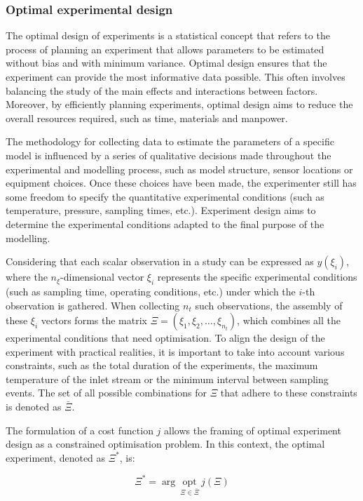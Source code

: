 \documentclass[a4paper,fleqn]{cas-dc}
\begin{document}
		\subsubsection{Optimal experimental design}
		
		The optimal design of experiments is a statistical concept that refers to the process of planning an experiment that allows parameters to be estimated without bias and with minimum variance. Optimal design ensures that the experiment can provide the most informative data possible. This often involves balancing the study of the main effects and interactions between factors. Moreover, by efficiently planning experiments, optimal design aims to reduce the overall resources required, such as time, materials and manpower.
		
		The methodology for collecting data to estimate the parameters of a specific model is influenced by a series of qualitative decisions made throughout the experimental and modelling process, such as model structure, sensor locations or equipment choices. Once these choices have been made, the experimenter still has some freedom to specify the quantitative experimental conditions (such as temperature, pressure, sampling times, etc.). Experiment design aims to determine the experimental conditions adapted to the final purpose of the modelling.
		
		Considering that each scalar observation in a study can be expressed as $y(\xi_i)$, where the $n_\xi$-dimensional vector $\xi_i$ represents the specific experimental conditions (such as sampling time, operating conditions, etc.) under which the $i$-th observation is gathered. When collecting $n_t$ such observations, the assembly of these $\xi_i$ vectors forms the matrix $\Xi = (\xi_1, \xi_2, \dots, \xi_{n_t})$, which combines all the experimental conditions that need optimisation. To align the design of the experiment with practical realities, it is important to take into account various constraints, such as the total duration of the experiments, the maximum temperature of the inlet stream or the minimum interval between sampling events. The set of all possible combinations for $\Xi$ that adhere to these constraints is denoted as $\bar{\Xi}$.
		
		The formulation of a cost function $j$ allows the framing of optimal experiment design as a constrained optimisation problem. In this context, the optimal experiment, denoted as $\Xi^*$, is:
		
		{\footnotesize \begin{equation} \Xi^* = \arg~\underset{\Xi \in \bar{\Xi}}{\text{opt}}~j\left(\Xi\right) \end{equation} }
		
\end{document}
